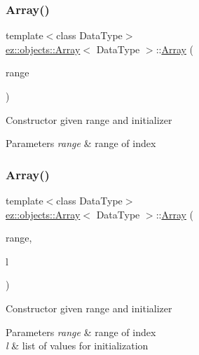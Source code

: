\subsubsection{\texorpdfstring{Array()}{Array()}\hspace{0.1cm}{\footnotesize\ttfamily [4/5]}}
{\footnotesize\ttfamily template$<$class Data\+Type$>$ \\
\hyperlink{classez_1_1objects_1_1Array}{ez\+::objects\+::\+Array}$<$ Data\+Type $>$\+::\hyperlink{classez_1_1objects_1_1Array}{Array} (\begin{DoxyParamCaption}\item[{\hyperlink{classez_1_1essential_1_1Range}{Range}}]{range }\end{DoxyParamCaption})\hspace{0.3cm}{\ttfamily [inline]}}

Constructor given range and initializer 
\begin{DoxyParams}{Parameters}
{\em range} & range of index \\
\hline
\end{DoxyParams}
\mbox{\label{classez_1_1objects_1_1Array_a599e786f9331bd12c7eeef4a6e1ad043}} 
\subsubsection{\texorpdfstring{Array()}{Array()}\hspace{0.1cm}{\footnotesize\ttfamily [5/5]}}
{\footnotesize\ttfamily template$<$class Data\+Type$>$ \\
\hyperlink{classez_1_1objects_1_1Array}{ez\+::objects\+::\+Array}$<$ Data\+Type $>$\+::\hyperlink{classez_1_1objects_1_1Array}{Array} (\begin{DoxyParamCaption}\item[{\hyperlink{classez_1_1essential_1_1Range}{Range}}]{range,  }\item[{const std\+::initializer\+\_\+list$<$ Data\+Type $>$ \&}]{l }\end{DoxyParamCaption})\hspace{0.3cm}{\ttfamily [inline]}}

Constructor given range and initializer 
\begin{DoxyParams}{Parameters}
{\em range} & range of index \\
\hline
{\em l} & list of values for initialization \\
\hline
\end{DoxyParams}
\mbox{\label{classez_1_1objects_1_1Array_aa7998741d7bd1d2f92248846b39f5b2a}} 

